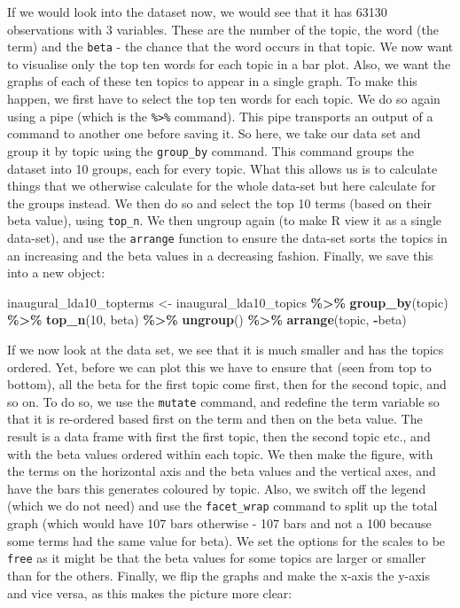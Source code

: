 \documentclass[
]{book}
\newenvironment{Shaded}{\begin{snugshade}}{\end{snugshade}}
\newcommand{\DecValTok}[1]{\textcolor[rgb]{0.00,0.00,0.81}{#1}}
\newcommand{\FunctionTok}[1]{\textcolor[rgb]{0.13,0.29,0.53}{\textbf{#1}}}
\newcommand{\NormalTok}[1]{#1}
\newcommand{\OtherTok}[1]{\textcolor[rgb]{0.56,0.35,0.01}{#1}}
\newcommand{\SpecialCharTok}[1]{\textcolor[rgb]{0.81,0.36,0.00}{\textbf{#1}}}
\begin{document}
If we would look into the dataset now, we would see that it has 63130 observations with 3 variables. These are the number of the topic, the word (the term) and the \texttt{beta} - the chance that the word occurs in that topic. We now want to visualise only the top ten words for each topic in a bar plot. Also, we want the graphs of each of these ten topics to appear in a single graph. To make this happen, we first have to select the top ten words for each topic. We do so again using a pipe (which is the \texttt{\%\textgreater{}\%} command). This pipe transports an output of a command to another one before saving it. So here, we take our data set and group it by topic using the \texttt{group\_by} command. This command groups the dataset into 10 groups, each for every topic. What this allows us is to calculate things that we otherwise calculate for the whole data-set but here calculate for the groups instead. We then do so and select the top 10 terms (based on their beta value), using \texttt{top\_n}. We then ungroup again (to make R view it as a single data-set), and use the \texttt{arrange} function to ensure the data-set sorts the topics in an increasing and the beta values in a decreasing fashion. Finally, we save this into a new object:

\begin{Shaded}
\begin{Highlighting}[]
\NormalTok{inaugural\_lda10\_topterms }\OtherTok{\textless{}{-}}\NormalTok{ inaugural\_lda10\_topics }\SpecialCharTok{\%\textgreater{}\%}
 \FunctionTok{group\_by}\NormalTok{(topic) }\SpecialCharTok{\%\textgreater{}\%}
 \FunctionTok{top\_n}\NormalTok{(}\DecValTok{10}\NormalTok{, beta) }\SpecialCharTok{\%\textgreater{}\%}
 \FunctionTok{ungroup}\NormalTok{() }\SpecialCharTok{\%\textgreater{}\%}
 \FunctionTok{arrange}\NormalTok{(topic, }\SpecialCharTok{{-}}\NormalTok{beta)}
\end{Highlighting}
\end{Shaded}

If we now look at the data set, we see that it is much smaller and has the topics ordered. Yet, before we can plot this we have to ensure that (seen from top to bottom), all the beta for the first topic come first, then for the second topic, and so on. To do so, we use the \texttt{mutate} command, and redefine the term variable so that it is re-ordered based first on the term and then on the beta value. The result is a data frame with first the first topic, then the second topic etc., and with the beta values ordered within each topic. We then make the figure, with the terms on the horizontal axis and the beta values and the vertical axes, and have the bars this generates coloured by topic. Also, we switch off the legend (which we do not need) and use the \texttt{facet\_wrap} command to split up the total graph (which would have 107 bars otherwise - 107 bars and not a 100 because some terms had the same value for beta). We set the options for the scales to be \texttt{free} as it might be that the beta values for some topics are larger or smaller than for the others. Finally, we flip the graphs and make the x-axis the y-axis and vice versa, as this makes the picture more clear:
\end{document}
